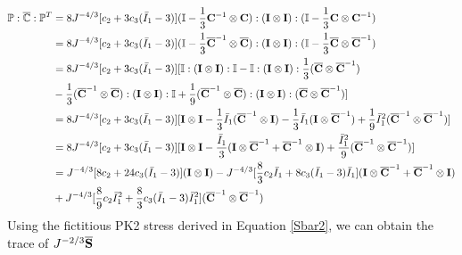 \begin{equation} \label{part12}
\begin{split}
\mathbb{P} : \overline{\mathbb{C}} : {\mathbb{P}}^T 
&= 8J^{-4/3}[c_2 + 3c_3(\bar{I}_1 - 3)] (\mathbb{I} - \frac{1}{3}{\bold{C}}^{-1} \otimes {\bold{C}})
: (\bold{I} \otimes \bold{I}) : (\mathbb{I} - \frac{1}{3}\bold{C} \otimes {\bold{C}}^{-1}) \\
&= 8J^{-4/3}[c_2 + 3c_3({\bar{I}}_1 - 3 )](\mathbb{I} - \frac{1}{3}{\overline{\bold{C}}}^{-1} \otimes {\overline{\bold{C}}}) : (\bold{I} \otimes \bold{I}): (\mathbb{I} - \frac{1}{3}{\overline{\bold{C}}} \otimes {\overline{\bold{C}}}^{-1}) \\
&= 8J^{-4/3}[c_2 + 3c_3({\bar{I}}_1 - 3 )][\mathbb{I}:(\bold{I} \otimes \bold{I}):\mathbb{I} - \mathbb{I}:(\bold{I} \otimes \bold{I}): \frac{1}{3} ({\overline{\bold{C}}} \otimes {\overline{\bold{C}}}^{-1}) \\
&- \frac{1}{3} ({\overline{\bold{C}}}^{-1} \otimes {\overline{\bold{C}}}) : (\bold{I} \otimes \bold{I}) : \mathbb{I} +  \frac{1}{9} ({\overline{\bold{C}}}^{-1} \otimes {\overline{\bold{C}}}) : (\bold{I} \otimes \bold{I}) : ({\overline{\bold{C}}} \otimes {\overline{\bold{C}}}^{-1}) ] \\
&= 8J^{-4/3}[c_2 + 3c_3({\bar{I}}_1 - 3 )][ \bold{I} \otimes \bold{I} - \frac{1}{3}\bar{I}_1({\overline{\bold{C}}}^{-1} \otimes \bold{I}) - \frac{1}{3}\bar{I}_1 (\bold{I} \otimes {\overline{\bold{C}}}^{-1}) + \frac{1}{9}{\bar{I}_1}^2({\overline{\bold{C}}}^{-1} \otimes {\overline{\bold{C}}}^{-1})] \\
&= 8J^{-4/3}[c_2 + 3c_3({\bar{I}}_1 - 3 )] [\bold{I} \otimes \bold{I} - \frac{{\bar{I}}_1}{3}(\bold{I} \otimes {\overline{\bold{C}}}^{-1} +{\overline{\bold{C}}}^{-1}  \otimes  \bold{I}) + \frac{{{\bar{I}}_1}^2}{9} ({\overline{\bold{C}}}^{-1} \otimes {\overline{\bold{C}}}^{-1}) ] \\
&=  J^{-4/3}[8c_2 + 24c_3({\bar{I}}_1 - 3 )] (\bold{I} \otimes \bold{I} ) -  J^{-4/3}[\frac{8}{3}c_2{\bar{I}}_1 + 8c_3({\bar{I}}_1 - 3 ){\bar{I}}_1] (\bold{I} \otimes {\overline{\bold{C}}}^{-1} +{\overline{\bold{C}}}^{-1}  \otimes  \bold{I}) \\
&+
J^{-4/3}[\frac{8}{9}c_2{\bar{I}_1}^2 + \frac{8}{3}c_3({\bar{I}}_1 - 3 ){\bar{I}_1}^2] ({\overline{\bold{C}}}^{-1} \otimes {\overline{\bold{C}}}^{-1})
\end{split}
\end{equation}
Using the fictitious PK2 stress derived in Equation \ref{Sbar2}, we can obtain the trace of $J^{-2/3}\overline{\bold{S}}$

